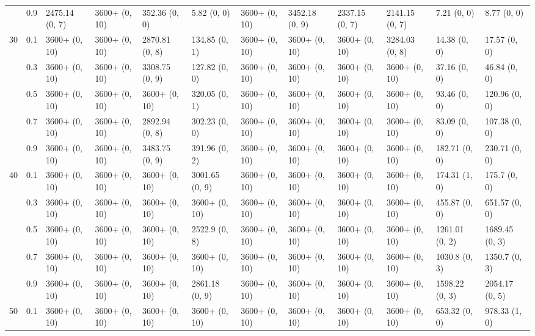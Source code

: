 \documentclass{article}
\begin{document}
\begin{table}
{\begin{tabular}{llllllllllll}
 & 0.9 & 2475.14 (0, 7) & 3600+ (0, 10) & 352.36 (0, 0) & 5.82 (0, 0) & 3600+ (0, 10) & 3452.18 (0, 9) & 2337.15 (0, 7) & 2141.15 (0, 7) & 7.21 (0, 0) & 8.77 (0, 0) \\
\cline{1-12}
\multirow[t]{5}{*}{30} & 0.1 & 3600+ (0, 10) & 3600+ (0, 10) & 2870.81 (0, 8) & 134.85 (0, 1) & 3600+ (0, 10) & 3600+ (0, 10) & 3600+ (0, 10) & 3284.03 (0, 8) & 14.38 (0, 0) & 17.57 (0, 0) \\
 & 0.3 & 3600+ (0, 10) & 3600+ (0, 10) & 3308.75 (0, 9) & 127.82 (0, 0) & 3600+ (0, 10) & 3600+ (0, 10) & 3600+ (0, 10) & 3600+ (0, 10) & 37.16 (0, 0) & 46.84 (0, 0) \\
 & 0.5 & 3600+ (0, 10) & 3600+ (0, 10) & 3600+ (0, 10) & 320.05 (0, 1) & 3600+ (0, 10) & 3600+ (0, 10) & 3600+ (0, 10) & 3600+ (0, 10) & 93.46 (0, 0) & 120.96 (0, 0) \\
 & 0.7 & 3600+ (0, 10) & 3600+ (0, 10) & 2892.94 (0, 8) & 302.23 (0, 0) & 3600+ (0, 10) & 3600+ (0, 10) & 3600+ (0, 10) & 3600+ (0, 10) & 83.09 (0, 0) & 107.38 (0, 0) \\
 & 0.9 & 3600+ (0, 10) & 3600+ (0, 10) & 3483.75 (0, 9) & 391.96 (0, 2) & 3600+ (0, 10) & 3600+ (0, 10) & 3600+ (0, 10) & 3600+ (0, 10) & 182.71 (0, 0) & 230.71 (0, 0) \\
\cline{1-12}
\multirow[t]{5}{*}{40} & 0.1 & 3600+ (0, 10) & 3600+ (0, 10) & 3600+ (0, 10) & 3001.65 (0, 9) & 3600+ (0, 10) & 3600+ (0, 10) & 3600+ (0, 10) & 3600+ (0, 10) & 174.31 (1, 0) & 175.7 (0, 0) \\
 & 0.3 & 3600+ (0, 10) & 3600+ (0, 10) & 3600+ (0, 10) & 3600+ (0, 10) & 3600+ (0, 10) & 3600+ (0, 10) & 3600+ (0, 10) & 3600+ (0, 10) & 455.87 (0, 0) & 651.57 (0, 0) \\
 & 0.5 & 3600+ (0, 10) & 3600+ (0, 10) & 3600+ (0, 10) & 2522.9 (0, 8) & 3600+ (0, 10) & 3600+ (0, 10) & 3600+ (0, 10) & 3600+ (0, 10) & 1261.01 (0, 2) & 1689.45 (0, 3) \\
 & 0.7 & 3600+ (0, 10) & 3600+ (0, 10) & 3600+ (0, 10) & 3600+ (0, 10) & 3600+ (0, 10) & 3600+ (0, 10) & 3600+ (0, 10) & 3600+ (0, 10) & 1030.8 (0, 3) & 1350.7 (0, 3) \\
 & 0.9 & 3600+ (0, 10) & 3600+ (0, 10) & 3600+ (0, 10) & 2861.18 (0, 9) & 3600+ (0, 10) & 3600+ (0, 10) & 3600+ (0, 10) & 3600+ (0, 10) & 1598.22 (0, 3) & 2054.17 (0, 5) \\
\cline{1-12}
\multirow[t]{5}{*}{50} & 0.1 & 3600+ (0, 10) & 3600+ (0, 10) & 3600+ (0, 10) & 3600+ (0, 10) & 3600+ (0, 10) & 3600+ (0, 10) & 3600+ (0, 10) & 3600+ (0, 10) & 653.32 (0, 0) & 978.33 (1, 0) \\

\end{tabular}}
\end{table}
\end{document}
